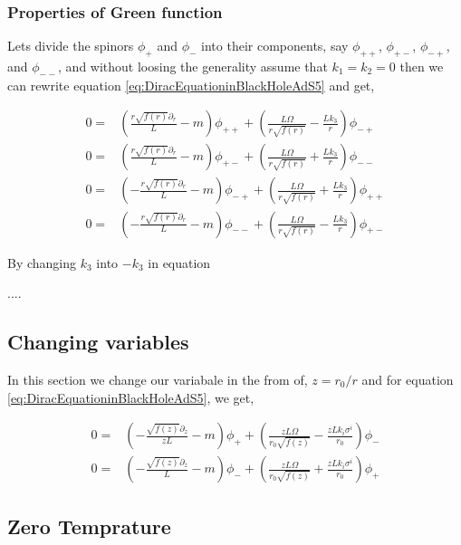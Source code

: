 \subsubsection{Properties of Green function}  

Lets divide the spinors $\phi_{+}$ and $\phi_{-}$ into their components, say $\phi_{++}$, $\phi_{+-}$, $\phi_{-+}$, and $\phi_{--}$, and without loosing the generality assume that $k_1=k_2=0$ then we can rewrite equation \ref{eq:DiracEquationinBlackHoleAdS5} and get,

\begin{align} \label{eq:DiracEquationinBlackHoleAdS5I}
    0 =& \left( \frac{r\sqrt{f(r)}\partial_r}{L} - m \right) \phi_{++} + \left( \frac{L\Omega}{r\sqrt{f(r)}} - \frac{Lk_3}{r} \right) \phi_{-+} \nonumber\\
    0 =& \left( \frac{r\sqrt{f(r)}\partial_r}{L} - m \right) \phi_{+-} + \left( \frac{L\Omega}{r\sqrt{f(r)}} + \frac{Lk_3}{r} \right) \phi_{--} \nonumber\\
    0 =& \left(-\frac{r\sqrt{f(r)}\partial_r}{L} - m \right) \phi_{-+} + \left( \frac{L\Omega}{r\sqrt{f(r)}} + \frac{Lk_3}{r} \right) \phi_{++} \nonumber\\
    0 =& \left(-\frac{r\sqrt{f(r)}\partial_r}{L} - m \right) \phi_{--} + \left( \frac{L\Omega}{r\sqrt{f(r)}} - \frac{Lk_3}{r} \right) \phi_{+-}
\end{align}
 
By changing $k_3$ into $-k_3$ in equation  

....

\subsection{Changing variables}

In this section we change our variabale in the from of, $z=r_0/r$ and for equation \ref{eq:DiracEquationinBlackHoleAdS5}, we get,

\begin{align}
    0 =& \left(-\frac{\sqrt{f(z)}\partial_z}{zL} - m \right) \phi_{+} + \left( \frac{zL\Omega}{r_0\sqrt{f(z)}} - \frac{zLk_i\sigma^i}{r_0} \right) \phi_{-} \nonumber\\
    0 =& \left(-\frac{\sqrt{f(z)}\partial_z}{L} - m \right) \phi_{-} + \left( \frac{zL\Omega}{r_0\sqrt{f(z)}} + \frac{zLk_i\sigma^i}{r_0} \right) \phi_{+}
\end{align}

\subsection{Zero Temprature}

